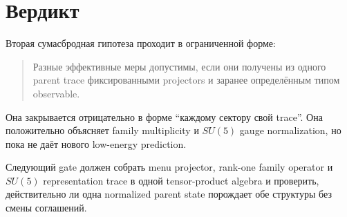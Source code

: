 \documentclass[12pt,a4paper]{article}
\begin{document}
\section{Вердикт}

Вторая сумасбродная гипотеза проходит в ограниченной форме:
\begin{quote}
Разные эффективные меры допустимы, если они получены из одного parent trace фиксированными projectors и заранее определённым типом observable.
\end{quote}

Она закрывается отрицательно в форме ``каждому сектору свой trace''. Она положительно объясняет family multiplicity и \(SU(5)\) gauge normalization, но пока не даёт нового low-energy prediction.

Следующий gate должен собрать menu projector, rank-one family operator и \(SU(5)\) representation trace в одной tensor-product algebra и проверить, действительно ли одна normalized parent state порождает обе структуры без смены соглашений.
\end{document}
